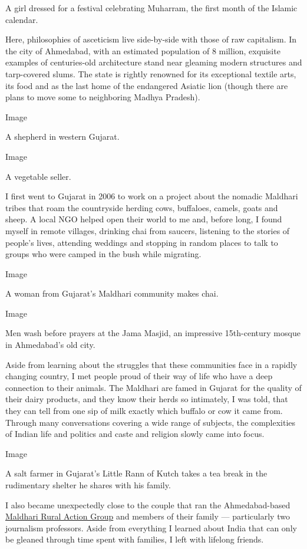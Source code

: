 A girl dressed for a festival celebrating Muharram, the first month of
the Islamic calendar.

Here, philosophies of asceticism live side-by-side with those of raw
capitalism. In the city of Ahmedabad, with an estimated population of 8
million, exquisite examples of centuries-old architecture stand near
gleaming modern structures and tarp-covered slums. The state is rightly
renowned for its exceptional textile arts, its food and as the last home
of the endangered Asiatic lion (though there are plans to move some to
neighboring Madhya Pradesh).

Image

A shepherd in western Gujarat.

Image

A vegetable seller.

I first went to Gujarat in 2006 to work on a project about the nomadic
Maldhari tribes that roam the countryside herding cows, buffaloes,
camels, goats and sheep. A local NGO helped open their world to me and,
before long, I found myself in remote villages, drinking chai from
saucers, listening to the stories of people's lives, attending weddings
and stopping in random places to talk to groups who were camped in the
bush while migrating.

Image

A woman from Gujarat's Maldhari community makes chai.~

Image

Men wash before prayers at the Jama Masjid, an impressive 15th-century
mosque in Ahmedabad's old city.

Aside from learning about the struggles that these communities face in a
rapidly changing country, I met people proud of their way of life who
have a deep connection to their animals. The Maldhari are famed in
Gujarat for the quality of their dairy products, and they know their
herds so intimately, I was told, that they can tell from one sip of milk
exactly which buffalo or cow it came from. Through many conversations
covering a wide range of subjects, the complexities of Indian life and
politics and caste and religion slowly came into focus.

Image

A salt farmer in Gujarat's Little Rann of Kutch takes a tea break in the
rudimentary shelter he shares with his family.

I also became unexpectedly close to the couple that ran the
Ahmedabad-based \href{http://www.marag.org/}{Maldhari Rural Action
Group} and members of their family --- particularly two journalism
professors. Aside from everything I learned about India that can only be
gleaned through time spent with families, I left with lifelong friends.

